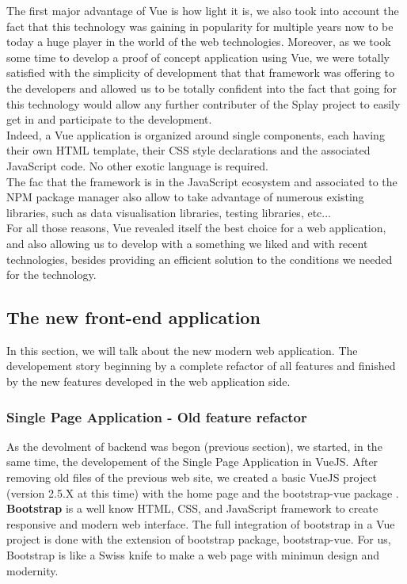\documentclass{eplmastersthesis}
\begin{document}
        The first major advantage of Vue is how light it is, we also took into
        account the fact that this technology was gaining in popularity for
        multiple years now to be today a huge player in the world of the web
        technologies. Moreover, as we took some time to develop a proof
        of concept application using Vue, we were totally satisfied with the
        simplicity of development that that framework was offering to the
        developers and allowed us to be totally confident into the fact
        that going for this technology would allow any further contributer
        of the Splay project to easily get in and participate to the
        development.\\
        Indeed, a Vue application is organized around single components, each
        having their own HTML template, their CSS style declarations and
        the associated JavaScript code. No other exotic language is required.\\
        The fac that the framework is in the JavaScript ecosystem and
        associated to the NPM package manager also allow to take advantage of
        numerous existing libraries, such as data visualisation libraries,
        testing libraries, etc... \\

        For all those reasons, Vue revealed itself the best choice for a
        web application, and also allowing us to develop with a something
        we liked and with recent technologies, besides providing an efficient
        solution to the conditions we needed for the technology.

      \subsection{The new front-end application}

        In this section, we will talk about the new modern web application.
        The developement story beginning by a complete refactor of all features
        and finished by the new features developed in the web application side.

        \subsubsection{Single Page Application - Old feature refactor}
        As the devolment of backend was begon (previous section), we started, in the same time, the
        developement of the Single Page Application in VueJS. After removing
        old files of the previous web site, we created a basic VueJS project
        (version 2.5.X at this time) with the home page and the bootstrap-vue
        package \cite{BootstrapVue}. \textbf{Bootstrap} \cite{Bootstrap} is a
        well know HTML, CSS, and JavaScript framework to create responsive and
        modern web interface. The full integration of bootstrap in a Vue
        project is done with the extension of bootstrap package, bootstrap-vue.
        For us, Bootstrap is like a Swiss knife to make a web page with minimun
        design and modernity. \\
\end{document}
